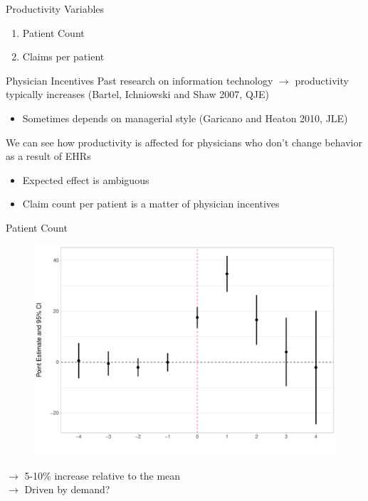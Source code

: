\documentclass[10pt]{beamer}
\begin{document}
\begin{frame}{Productivity Variables}
    \begin{enumerate}
        \item Patient Count
        \vspace{6mm}
        \item Claims per patient
    \end{enumerate}
\end{frame}

\begin{frame}{Physician Incentives}
Past research on information technology $\rightarrow$ productivity typically increases \scriptsize (Bartel, Ichniowski and Shaw 2007, QJE)
                \vspace{3mm}
\begin{itemize}
                \normalsize 
    \item Sometimes depends on managerial style \scriptsize(Garicano and Heaton 2010, JLE)
\end{itemize}
                \vspace{6mm}
                \normalsize 
We can see how productivity is affected for physicians who don't change behavior as a result of EHRs
                \vspace{3mm}
\begin{itemize}
    \item Expected effect is ambiguous
                \vspace{3mm}
    \item Claim count per patient is a matter of physician incentives
\end{itemize}
\end{frame}

\begin{frame}{Patient Count}
\begin{figure}[ht]
\centering
\includegraphics[scale=.35]{Objects/Presentation_patients_all.pdf}
\end{figure}
$\rightarrow$ 5-10\% increase relative to the mean\\
$\rightarrow$ Driven by demand? 
\end{frame}
\end{document}
